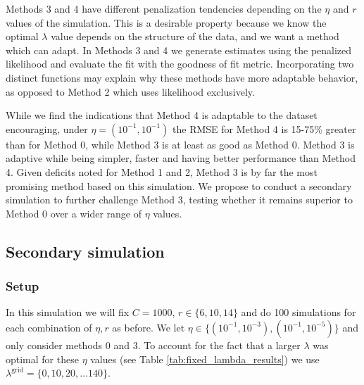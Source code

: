 \documentclass[oupdraft]{bio}
\newcommand{\lambdagrid}{\lambda^{\text{grid}}}
\begin{document}
Methods 3 and 4 have different penalization tendencies depending on the $\eta$ and $r$ values of the simulation.  This is a desirable property because we know the optimal $\lambda$ value depends on the structure of the data, and we want a method which can adapt.  In Methods 3 and 4 we generate estimates using the penalized likelihood and evaluate the fit with the goodness of fit metric.  Incorporating two distinct functions may explain why these methods have more adaptable behavior, as opposed to Method 2 which uses likelihood exclusively.

While we find the indications that Method 4 is adaptable to the dataset encouraging, under $\eta = (10^{-1}, 10^{-1})$ the RMSE for Method 4 is 15-75\% greater than for Method 0, while Method 3 is at least as good as Method 0.  Method 3 is adaptive while being simpler, faster and having better performance than Method 4.  Given deficits noted for Method 1 and 2, Method 3 is by far the most promising method based on this simulation.  We propose to conduct a secondary simulation to further challenge Method 3, testing whether it remains superior to Method 0 over a wider range of $\eta$ values.

\subsection{Secondary simulation}
\label{sec:tuning_simulation_2}

\subsubsection{Setup}

In this simulation we will fix $C = 1000$, $r \in \{6, 10, 14\}$ and do 100 simulations for each combination of $\eta, r$ as before.  We let $\eta \in \{ (10^{-1}, 10^{-3}), (10^{-1}, 10^{-5}) \}$ and only consider methods 0 and 3.  To account for the fact that a larger $\lambda$ was optimal for these $\eta$ values (see Table \ref{tab:fixed_lambda_results}) we use $\lambdagrid = \{0,10,20, \dots 140 \}$.
\end{document}
